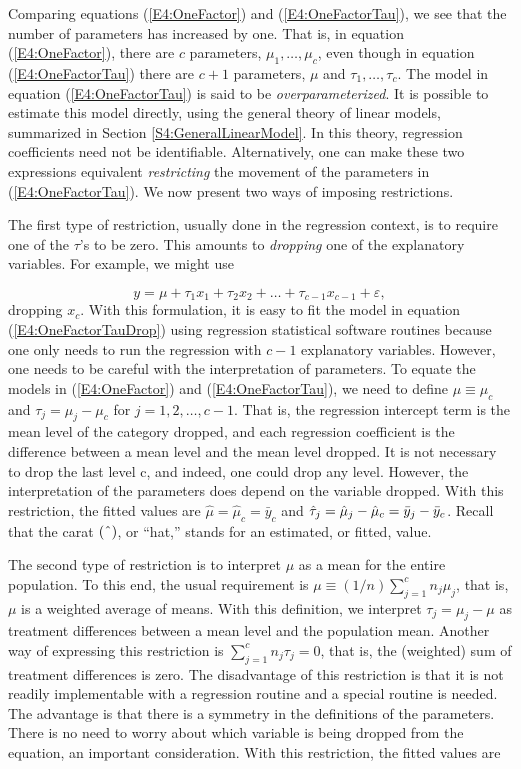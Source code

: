 Comparing equations (\ref{E4:OneFactor}) and
(\ref{E4:OneFactorTau}), we see that the number of parameters
has increased by one. That is, in equation (\ref{E4:OneFactor}), there are $c$ parameters, $%
\mu_1,\ldots ,\mu_c$, even though in equation
(\ref{E4:OneFactorTau}) there are $c+1$ parameters, $\mu $ and $\tau
_1,\ldots ,\tau_c$. The model in equation (\ref{E4:OneFactorTau}) is
said to be \textit{overparameterized}. It is possible to estimate
this model directly, using the general theory of linear models,
summarized in Section \ref{S4:GeneralLinearModel}. In this theory,
regression coefficients need not be identifiable. Alternatively, one
can make these two expressions equivalent \textit{restricting} the
movement of the parameters in (\ref{E4:OneFactorTau}). We now
present two ways of imposing restrictions.

The first type of restriction, usually done in the regression context, is to
require one of the $\tau $'s to be zero. This amounts to \textit{dropping}
one of the explanatory variables. For example, we might use

\begin{equation}  \label{E4:OneFactorTauDrop}
y=\mu +\tau_1x_1+\tau_2x_2+\ldots +\tau _{c-1}x_{c-1}+\varepsilon,
\end{equation}%
dropping $x_{c}$. With this formulation, it is easy to fit the model
in equation (\ref{E4:OneFactorTauDrop}) using regression statistical
software routines because one only needs to run the regression with
$c-1$ explanatory variables. However, one needs to be careful with
the interpretation of parameters. To equate the models in
(\ref{E4:OneFactor}) and (\ref{E4:OneFactorTau}), we need to define
$\mu \equiv \mu_c$ and $\tau_j=\mu_j-\mu_c$ for $j=1,2,\ldots ,c-1$.
That is, the regression intercept term is the mean level of the
category dropped, and each regression coefficient is the difference
between a mean level and the mean level dropped. It is not necessary
to drop the last level c, and indeed, one could drop any level.
However, the interpretation of the parameters does depend on the
variable dropped. With this restriction, the fitted values are
$\hat{\mu}=\hat{\mu}_{c}=\bar{y}_{c}$ and $\hat{\tau}_j=\hat{\mu}_j-\hat{%
\mu}_{c}=\bar{y}_j-\bar{y}_{c}$. Recall that the carat
$(\symbol{94})$, or ``hat,'' stands for an estimated, or fitted,
value.

The second type of restriction is to
interpret $\mu $ as a mean for the entire population. To this end,
the usual requirement is $\mu \equiv (1/n) \sum_{j=1}^c n_j \mu_j$,
that is, $\mu $ is a weighted average of means. With this
definition, we interpret $\tau_j = \mu _j - \mu$ as treatment
differences between a mean level and the population mean. Another
way of expressing this restriction is $\sum_{j=1}^{c}n_j\tau_j=0 $,
that is, the (weighted) sum of treatment differences is zero. The
disadvantage of this restriction is that it is not readily
implementable with a regression routine and a special routine is
needed. The advantage is that there is a symmetry in the definitions
of the parameters. There is no need to worry about which variable is
being dropped from the equation, an important consideration. With
this restriction, the fitted values are

